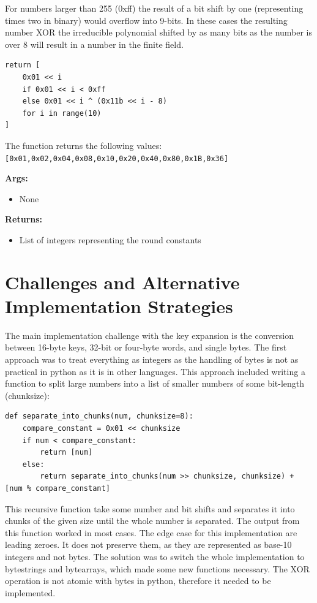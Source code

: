 For numbers larger than 255 (0xff) the result of a bit shift by one (representing times two in binary) would overflow into 9-bits. In these cases the resulting number XOR the irreducible polynomial shifted by as many bits as the number is over 8 will result in a number in the finite field.

\begin{lstlisting}
return [
    0x01 << i
    if 0x01 << i < 0xff
    else 0x01 << i ^ (0x11b << i - 8)
    for i in range(10)
]
\end{lstlisting}

The function returns the following values:
 \lstinline{[0x01,0x02,0x04,0x08,0x10,0x20,0x40,0x80,0x1B,0x36]}

\textbf{Args:}
\begin{itemize}
  \item None
\end{itemize}

\textbf{Returns:}
\begin{itemize}
  \item List of integers representing the round constants
\end{itemize}

\section{Challenges and Alternative Implementation Strategies}
The main implementation challenge with the key expansion is the conversion between 16-byte keys, 32-bit or four-byte words, and single bytes. The first approach was to treat everything as integers as the handling of bytes is not as practical in python as it is in other languages. This approach included writing a function to split large numbers into a list of smaller numbers of some bit-length (chunksize):
\begin{lstlisting}
def separate_into_chunks(num, chunksize=8):
    compare_constant = 0x01 << chunksize
    if num < compare_constant:
        return [num]
    else:
        return separate_into_chunks(num >> chunksize, chunksize) + [num % compare_constant]
\end{lstlisting}
This recursive function take some number and bit shifts and separates it into chunks of the given size until the whole number is separated. The output from this function worked in most cases. The edge case for this implementation are leading zeroes. It does not preserve them, as they are represented as base-10 integers and not bytes. The solution was to switch the whole implementation to bytestrings and bytearrays, which made some new functions necessary. The XOR operation is not atomic with bytes in python, therefore it needed to be implemented.

